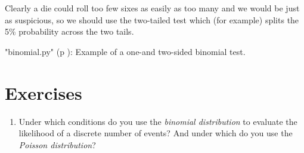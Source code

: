 Clearly a die could roll too few sixes as easily as too many and we would be just as suspicious, so we should use the two-tailed test which (for example) splits the 5\% probability across the two tails.

\PyImg "binomial.py" (p \pageref{py:binomial}): Example of a one-and two-sided binomial test.

\section{Exercises}

\begin{enumerate}
    \item Under which conditions do you use the \emph{binomial distribution} to evaluate the likelihood of a discrete number of events? And under which do you use the \emph{Poisson distribution}?
\end{enumerate}